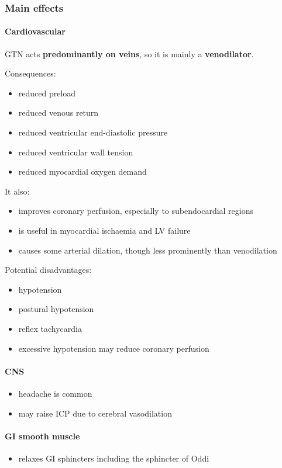 \documentclass[11pt,a4paper]{article}
\begin{document}
\subsubsection*{Main effects}

\paragraph{Cardiovascular}
GTN acts \textbf{predominantly on veins}, so it is mainly a \textbf{venodilator}.

Consequences:
\begin{itemize}
    \item reduced preload
    \item reduced venous return
    \item reduced ventricular end-diastolic pressure
    \item reduced ventricular wall tension
    \item reduced myocardial oxygen demand
\end{itemize}

It also:
\begin{itemize}
    \item improves coronary perfusion, especially to subendocardial regions
    \item is useful in myocardial ischaemia and LV failure
    \item causes some arterial dilation, though less prominently than venodilation
\end{itemize}

Potential disadvantages:
\begin{itemize}
    \item hypotension
    \item postural hypotension
    \item reflex tachycardia
    \item excessive hypotension may reduce coronary perfusion
\end{itemize}

\paragraph{CNS}
\begin{itemize}
    \item headache is common
    \item may raise ICP due to cerebral vasodilation
\end{itemize}

\paragraph{GI smooth muscle}
\begin{itemize}
    \item relaxes GI sphincters including the sphincter of Oddi
\end{itemize}
\end{document}
